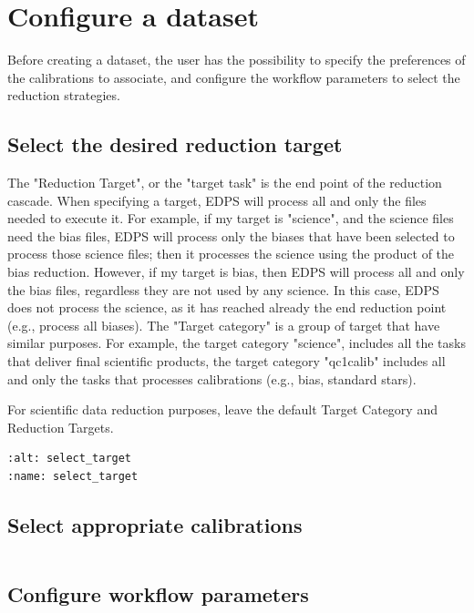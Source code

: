 \documentclass{article}
\begin{document}
            \section{Configure a dataset}

Before creating a dataset, the user has the possibility to 
specify the preferences of the calibrations to associate, and configure the 
workflow parameters to select the reduction strategies. 

\subsection{Select the desired reduction target}
The "Reduction Target", or the "target task" is the end point of the reduction cascade. When specifying a target, EDPS will process
all and only the files needed to execute it. For example, if my target is "science", and the science files
need the bias files, EDPS will process only the biases that have been selected to process those science files; then it 
processes the science using the product of the bias reduction.
However, if my target is bias, then EDPS will process all and only the bias files, regardless they are not used by any science. 
In this case, EDPS does not process the science, as it has reached already the end reduction point (e.g., process all biases).
The "Target category" is a group of target that have similar purposes. For example, the target category "science", includes
all the tasks that deliver final scientific products, the target category "qc1calib" includes all and only the tasks that 
processes calibrations (e.g., bias, standard stars).

For scientific data reduction purposes, leave the default Target Category and Reduction Targets. 


\begin{verbatim}
:alt: select_target
:name: select_target
\end{verbatim}


\subsection{Select appropriate calibrations}
\begin{verbatim}
\end{verbatim}

\subsection{Configure workflow parameters}
\end{document}
